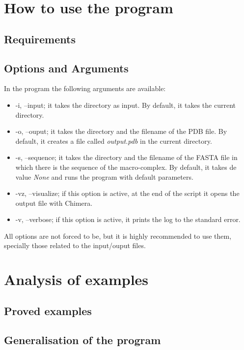 \documentclass[a4paper,12pt]{report}
\begin{document}
\chapter{How to use the program}

\section{Requirements}

\section{Options and Arguments}

In the program the following arguments are available:

\begin{itemize}
 \item -i, --input; it takes the directory as input. By default, it takes the current directory.
 \item -o, --ouput; it takes the directory and the filename of the PDB file. By default, it creates a file called \textit{output.pdb} in the current directory.
 \item -s, --sequence; it takes the directory and the filename of the FASTA file in which there is the sequence of the macro-complex. By default, it takes de value \textit{None} and runs the program with default parameters.
 \item -vz, --visualize; if this option is active, at the end of the script it opens the output file with Chimera.
 \item -v, --verbose; if this option is active, it prints the log to the standard error. 
\end{itemize}

All options are not forced to be, but it is highly recommended to use them, specially those related to the input/ouput files.


\chapter{Analysis of examples}

\section{Proved examples}

\section{Generalisation of the program}
\end{document}
